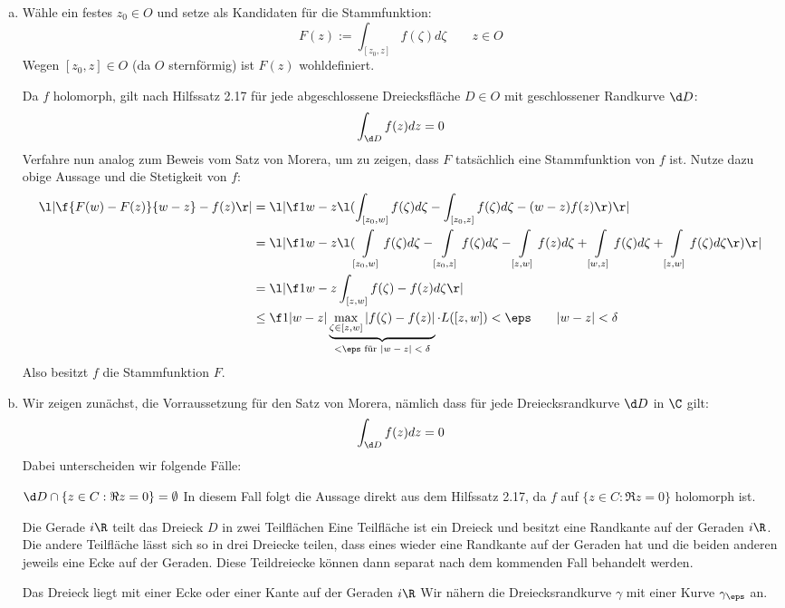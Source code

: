 \documentclass[a4paper]{scrartcl}
\begin{document}
	\setcounter{section}{4}
	\begin{aufgabe}
		\begin{enumerate}[a)]
			\item
				Wähle ein festes $z_0\in O$ und setze als Kandidaten für die Stammfunktion:
				\[
					F(z) := \int_{[z_0,z]} f(\zeta) d\zeta \qquad z\in O
				\]
				Wegen $[z_0,z]\in O$ (da $O$ sternförmig) ist $F(z)$ wohldefiniert.

				Da $f$ holomorph, gilt nach Hilfssatz 2.17 für jede abgeschlossene Dreiecksfläche $D\in O$ mit geschlossener Randkurve $\d D$:
				\[
					\int_{\d D} f(z) dz = 0
				\]
				Verfahre nun analog zum Beweis vom Satz von Morera, um zu zeigen, dass $F$ tatsächlich eine Stammfunktion von $f$ ist.
				Nutze dazu obige Aussage und die Stetigkeit von $f$:
				\begin{align*}
					\l| \f {F(w)-F(z)}{w-z} - f(z) \r|
					&= \l| \f 1{w-z} \l( \int_{[z_0,w]}f(\zeta) d\zeta - \int_{[z_0,z]}f(\zeta)d\zeta - (w-z) f(z) \r) \r| \\
					&= \l| \f 1{w-z} \l( \int\limits_{[z_0,w]}f(\zeta) d\zeta - \int\limits_{[z_0,z]}f(\zeta)d\zeta - \int\limits_{[z,w]}f(z) d\zeta + \int\limits_{[w,z]}f(\zeta) d\zeta + \int\limits_{[z,w]} f(\zeta) d\zeta \r)\r| \\
					&= \l| \f 1{w-z} \int_{[z,w]} f(\zeta) - f(z) d\zeta \r| \\
					&\le \f 1{|w-z|} \underbrace{\max_{\zeta\in [z,w]} |f(\zeta) - f(z)|}_{< \eps \text{ für $|w-z|<\delta$}} \cdot L([z,w])
					< \eps \qquad |w-z| < \delta
				\end{align*}
				Also besitzt $f$ die Stammfunktion $F$.
			\item
				Wir zeigen zunächst, die Vorraussetzung für den Satz von Morera, nämlich dass für jede Dreiecksrandkurve $\d D$ in $\C$ gilt:
				\[
					\int_{\d D} f(z) dz = 0
				\]
				Dabei unterscheiden wir folgende Fälle:

				\begin{seg}{$\d D \cap \{z\in C : \Re z = 0\} = \emptyset$}
					In diesem Fall folgt die Aussage direkt aus dem Hilfssatz 2.17, da $f$ auf $\{z\in C : \Re z = 0\}$ holomorph ist.										
				\end{seg}
				\begin{seg}{Die Gerade $i\R$ teilt das Dreieck $D$ in zwei Teilflächen}
					Eine Teilfläche ist ein Dreieck und besitzt eine Randkante auf der Geraden $i\R$.
					Die andere Teilfläche lässt sich so in drei Dreiecke teilen, dass eines wieder eine Randkante auf der Geraden hat und die beiden anderen jeweils eine Ecke auf der Geraden.
					Diese Teildreiecke können dann separat nach dem kommenden Fall behandelt werden.
				\end{seg}
				\begin{seg}{Das Dreieck liegt mit einer Ecke oder einer Kante auf der Geraden $i\R$}
					Wir nähern die Dreiecksrandkurve $\gamma$ mit einer Kurve $\gamma_\eps$ an.


\end{seg}
\end{enumerate}
\end{aufgabe}
\end{document}
